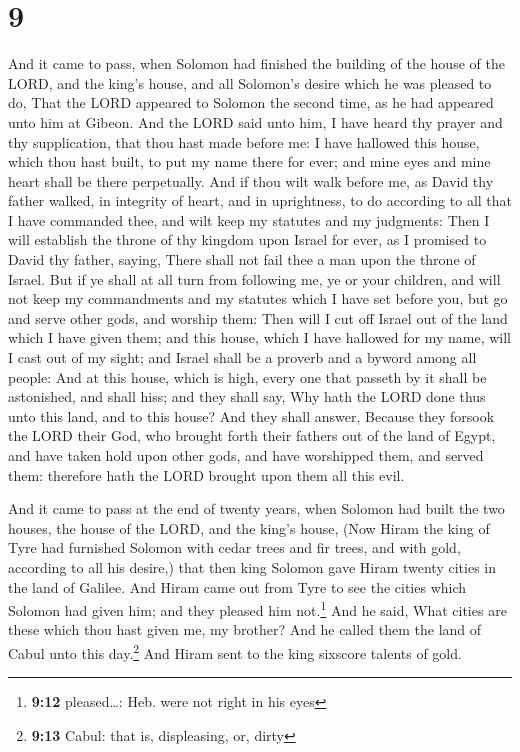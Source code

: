 \hypertarget{section-8}{%
\section{9}\label{section-8}}

 And it came to pass, when Solomon had finished the
building of the house of the LORD, and the king's house, and all
Solomon's desire which he was pleased to do,  That the
LORD appeared to Solomon the second time, as he had appeared unto him at
Gibeon.  And the LORD said unto him, I have heard thy
prayer and thy supplication, that thou hast made before me: I have
hallowed this house, which thou hast built, to put my name there for
ever; and mine eyes and mine heart shall be there perpetually.
 And if thou wilt walk before me, as David thy father
walked, in integrity of heart, and in uprightness, to do according to
all that I have commanded thee, and wilt keep my statutes and my
judgments:  Then I will establish the throne of thy
kingdom upon Israel for ever, as I promised to David thy father, saying,
There shall not fail thee a man upon the throne of Israel.
 But if ye shall at all turn from following me, ye or your
children, and will not keep my commandments and my statutes which I have
set before you, but go and serve other gods, and worship them:
 Then will I cut off Israel out of the land which I have
given them; and this house, which I have hallowed for my name, will I
cast out of my sight; and Israel shall be a proverb and a byword among
all people:  And at this house, which is high, every one
that passeth by it shall be astonished, and shall hiss; and they shall
say, Why hath the LORD done thus unto this land, and to this house?
 And they shall answer, Because they forsook the LORD
their God, who brought forth their fathers out of the land of Egypt, and
have taken hold upon other gods, and have worshipped them, and served
them: therefore hath the LORD brought upon them all this evil.

 And it came to pass at the end of twenty years, when
Solomon had built the two houses, the house of the LORD, and the king's
house,  (Now Hiram the king of Tyre had furnished Solomon
with cedar trees and fir trees, and with gold, according to all his
desire,) that then king Solomon gave Hiram twenty cities in the land of
Galilee.  And Hiram came out from Tyre to see the cities
which Solomon had given him; and they pleased him not.\footnote{\textbf{9:12}
  pleased\ldots: Heb. were not right in his eyes}  And he
said, What cities are these which thou hast given me, my brother? And he
called them the land of Cabul unto this day.\footnote{\textbf{9:13}
  Cabul: that is, displeasing, or, dirty}  And Hiram sent
to the king sixscore talents of gold.

